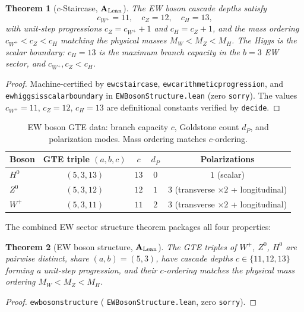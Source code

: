 \documentclass[11pt]{article}
\newtheorem{theorem}{Theorem}[section]
\theoremstyle{remark}
\newcommand{\lean}[1]{%
  \penalty-100
  \begingroup\def\_{\textunderscore\allowbreak}\texttt{#1}\endgroup}
\newcommand{\CatAL}{\ensuremath{\textbf{A}_{\rm Lean}}}
\begin{document}
\begin{theorem}[$c$-Staircase, $\CatAL$]\label{thm:ew_staircase}
The EW boson cascade depths satisfy
\[
c_{W^+} = 11,\quad c_Z = 12,\quad c_H = 13,
\]
with unit-step progressions $c_Z = c_{W^+} + 1$ and $c_H = c_Z + 1$, and the mass ordering
$c_{W^+} < c_Z < c_H$ matching the physical masses $M_W < M_Z < M_H$.
The Higgs is the scalar boundary: $c_H = 13$ is the maximum branch capacity in the $b=3$
EW sector, and $c_{W^+}, c_Z < c_H$.
\end{theorem}

\begin{proof}
Machine-certified by \lean{ew\_c\_staircase},
\lean{ew\_c\_arithmetic\_progression}, and \lean{ew\_higgs\_is\_scalar\_boundary}
in \lean{EWBosonStructure.lean} (zero \texttt{sorry}).
The values $c_{W^+} = 11$, $c_Z = 12$, $c_H = 13$ are definitional constants verified
by \texttt{decide}.
\end{proof}

\begin{table}[H]
\centering
\small
\caption{EW boson GTE data: branch capacity $c$, Goldstone count $d_P$, and
polarization modes. Mass ordering matches $c$-ordering.}
\label{tab:ew_staircase}
\begin{tabular}{lcccc}
\toprule
\textbf{Boson} & \textbf{GTE triple} $(a,b,c)$ & $c$ & $d_P$ & \textbf{Polarizations}\\
\midrule
$H^0$   & $(5,3,13)$ & $13$ & $0$ & $1$ (scalar) \\
$Z^0$   & $(5,3,12)$ & $12$ & $1$ & $3$ (transverse $\times 2$ + longitudinal)\\
$W^+$   & $(5,3,11)$ & $11$ & $2$ & $3$ (transverse $\times 2$ + longitudinal)\\
\bottomrule
\end{tabular}
\end{table}

The combined EW sector structure theorem packages all four properties:

\begin{theorem}[EW boson structure, $\CatAL$]\label{thm:ew_boson_structure}
The GTE triples of $W^+$, $Z^0$, $H^0$ are pairwise distinct, share $(a,b) = (5,3)$,
have cascade depths $c \in \{11,12,13\}$ forming a unit-step progression, and their
$c$-ordering matches the physical mass ordering $M_W < M_Z < M_H$.
\end{theorem}

\begin{proof}
\lean{ew\_boson\_structure} (\lean{EWBosonStructure.lean}, zero \texttt{sorry}).
\end{proof}
\end{document}
